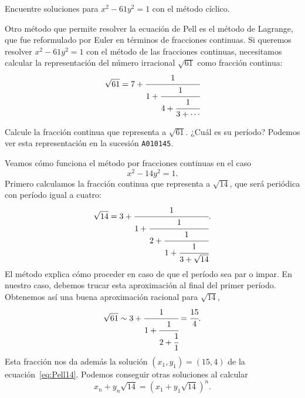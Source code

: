 \begin{exercise}
	Encuentre soluciones para $x^2-61y^2=1$ con el método cíclico. 
\end{exercise}

Otro método que permite resolver la ecuación de Pell es el método de Lagrange, 
que fue reformulado por Euler en términos de fracciones continuas. 
Si queremos resolver $x^2-61y^2=1$ con el método de las fracciones continuas, necesitamos 
calcular la representación del número irracional $\sqrt{61}$ como fracción
continua: 
\[
	\sqrt{61}=7+\cfrac{1}{1+\cfrac{1}{4+\cfrac{1}{3+\cdots}}}
\]

\begin{exercise}
	Calcule la fracción continua que representa a $\sqrt{61}$. ¿Cuál es su período?
	Podemos ver esta representación en la sucesión \verb+A010145+.
\end{exercise}

Veamos cómo funciona el método por fracciones continuas en el caso
\begin{equation}
	\label{eq:Pell14}
	x^2-14y^2=1.
\end{equation}
Primero calculamos la fracción continua que representa a $\sqrt{14}$, que será
periódica con período igual a cuatro:
\[
	\sqrt{14}=3+\cfrac{1}{1+\cfrac{1}{2+\cfrac{1}{1+\cfrac{1}{3+\sqrt{14}}}}}.
\]
El método explica cómo proceder en caso de que el período sea par o impar. En nuestro caso, debemos
trucar esta aproximación al final del primer período. Obtenemos así 
una buena aproximación racional para $\sqrt{14}$, 
\[
	\sqrt{61}\sim 3+\cfrac{1}{1+\cfrac{1}{2+\cfrac{1}{1}}}=\cfrac{15}{4}.
\]
Esta fracción nos da además la solución $(x_1,y_1)=(15,4)$ de la
ecuación~\eqref{eq:Pell14}.  Podemos conseguir otras soluciones al calcular
\[
	x_n+y_n\sqrt{14}=(x_1+y_1\sqrt{14})^n.
\]

